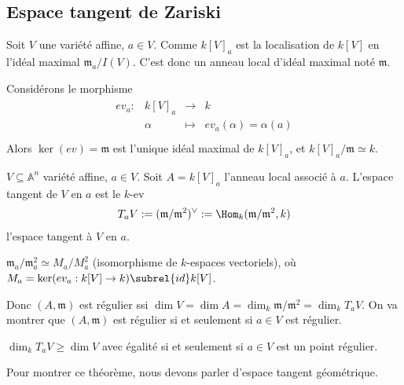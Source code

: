         \subsection{Espace tangent de Zariski}
            Soit $V$ une variété affine, $a \in V$. Comme $k[V]_a$ est la localisation de $k[V]$ en l'idéal maximal $\mathfrak{m}_a/I(V)$. C'est donc un anneau local d'idéal maximal noté 
            $\mathfrak{m}$.
            \begin{exo}
                Considérons le morphisme
                \begin{align*}
                    \begin{array}{cccc}
                        ev_a : & k[V]_a & \to & k \\
                        & \alpha & \mapsto & ev_a(\alpha) = \alpha(a) \\
                    \end{array}
                \end{align*}
                Alors $\ker(ev) = \mathfrak{m}$ est l'unique idéal maximal de $k[V]_a$, et $k[V]_a/\mathfrak{m} \simeq k$. 
            \end{exo}
            \begin{defi}
                $V \subseteq \mathbb{A}^n$ variété affine, $a \in V$. Soit $A = k[V]_a$ l'anneau local associé à $a$. L'espace tangent de $V$ en $a$ est le $k$-ev
                \begin{align*}
                    T_aV := (\mathfrak{m}/ \mathfrak{m}^2)^{\vee} := \Hom_k(\mathfrak{m}/ \mathfrak{m}^2, k)
                \end{align*}
                l'espace tangent à $V$ en $a$.
            \end{defi}
            \begin{remq}
                \label{remq344}
                $\mathfrak{m}_a/\mathfrak{m}_a^2 \simeq M_a/M_a^2$ (isomorphisme de $k$-espaces vectoriels), où $M_a = \ker (ev_a : k[V] \to k) \subrel{id} k[V]$. 
            \end{remq}
            \begin{theo}
            \end{theo}
            Donc $(A, \mathfrak{m})$ est régulier ssi $\dim V =\dim A = \dim_k \mathfrak{m}/ \mathfrak{m}^2 = \dim_k T_aV$. On va montrer que $(A, \mathfrak{m})$ est régulier si et seulement si $a \in V$ est régulier.
            \begin{theo}
                $\dim_k T_aV \geq \dim V$ avec égalité si et seulement si $a \in V$ est un point régulier.
            \end{theo}
            Pour montrer ce théorème, nous devons parler d'espace tangent géométrique.
        
